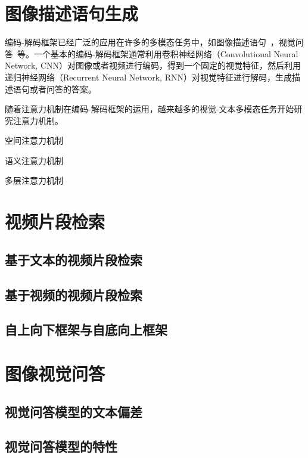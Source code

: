 \section{图像描述语句生成}
编码-解码框架已经广泛的应用在许多的多模态任务中，如图像描述语句~\cite{vinyals2015show,karpathy2015deep,donahue2015long,venugopalan2015sequence,venugopalan2014translating}，视觉问答~\cite{antol2015vqa,malinowski2015ask,gao2015you,ren2015exploring}等。一个基本的编码-解码框架通常利用卷积神经网络（Convolutional Neural Network, CNN）对图像或者视频进行编码，得到一个固定的视觉特征，然后利用递归神经网络（Recurrent Neural Network, RNN）对视觉特征进行解码，生成描述语句或者问答的答案。


随着注意力机制在编码-解码框架的运用，越来越多的视觉-文本多模态任务开始研究注意力机制。

空间注意力机制


语义注意力机制


多层注意力机制







\section{视频片段检索}

\subsection{基于文本的视频片段检索}


\subsection{基于视频的视频片段检索}


\subsection{自上向下框架与自底向上框架}







\section{图像视觉问答}


\subsection{视觉问答模型的文本偏差}


\subsection{视觉问答模型的特性}


